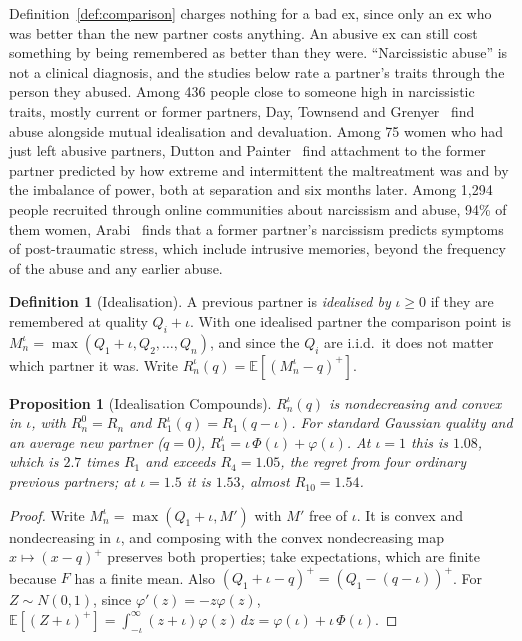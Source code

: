 \documentclass[11pt]{article}
\newtheorem{proposition}[theorem]{Proposition}
\theoremstyle{definition}
\newtheorem{definition}[theorem]{Definition}
\theoremstyle{remark}
\begin{document}
Definition~\ref{def:comparison} charges nothing for a bad ex, since only
an ex who was better than the new partner costs anything. An abusive ex
can still cost something by being remembered as better than they were.
``Narcissistic abuse'' is not a clinical diagnosis, and the studies
below rate a partner's traits through the person they abused. Among 436
people close to someone high in narcissistic traits, mostly current or
former partners, Day, Townsend and Grenyer~\cite{day} find abuse
alongside mutual idealisation and devaluation. Among 75 women who had
just left abusive partners, Dutton and Painter~\cite{dutton} find
attachment to the former partner predicted by how extreme and
intermittent the maltreatment was and by the imbalance of power, both at
separation and six months later.
Among 1,294 people recruited through online communities about narcissism
and abuse, 94\% of them women, Arabi~\cite{arabi} finds that a former
partner's narcissism predicts symptoms of post-traumatic stress, which
include intrusive memories, beyond the frequency of the abuse and any
earlier abuse.

\begin{definition}[Idealisation]
  A previous partner is \emph{idealised by} $\iota\ge0$ if they are
  remembered at quality $Q_i+\iota$. With one idealised partner the
  comparison point is $M_n^\iota = \max(Q_1+\iota,Q_2,\dots,Q_n)$, and
  since the $Q_i$ are i.i.d.\ it does not matter which partner it was.
  Write $R_n^\iota(q) = \mathbb{E}[(M_n^\iota-q)^+]$.
\end{definition}

\begin{proposition}[Idealisation Compounds]\label{prop:ideal}
  $R_n^\iota(q)$ is nondecreasing and convex in $\iota$, with $R_n^0 =
  R_n$ and $R_1^\iota(q) = R_1(q-\iota)$. For standard Gaussian quality
  and an average new partner ($q=0$), $R_1^\iota = \iota\,\Phi(\iota) +
  \varphi(\iota)$. At $\iota = 1$ this is $1.08$, which is $2.7$ times
  $R_1$ and exceeds $R_4 = 1.05$, the regret from four ordinary previous
  partners; at $\iota = 1.5$ it is $1.53$, almost $R_{10} = 1.54$.
\end{proposition}

\begin{proof}
  Write $M_n^\iota = \max(Q_1+\iota, M')$ with $M'$ free of $\iota$. It
  is convex and nondecreasing in $\iota$, and composing with the convex
  nondecreasing map $x\mapsto(x-q)^+$ preserves both properties; take
  expectations, which are finite because $F$ has a finite mean. Also
  $(Q_1+\iota-q)^+ = (Q_1-(q-\iota))^+$. For $Z\sim N(0,1)$, since
  $\varphi'(z) = -z\varphi(z)$, $\mathbb{E}[(Z+\iota)^+] =
  \int_{-\iota}^\infty (z+\iota)\varphi(z)\,dz = \varphi(\iota) +
  \iota\,\Phi(\iota)$.
\end{proof}
\end{document}
